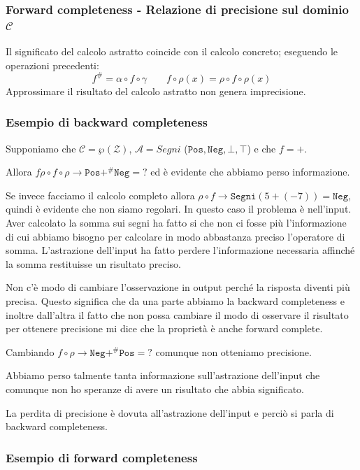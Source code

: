 \subsubsection{Forward completeness - Relazione di precisione sul dominio $\mathcal{C}$}
Il significato del calcolo astratto coincide con il calcolo concreto; eseguendo le operazioni 
precedenti:
\[
    f^\# = \alpha \circ f \circ \gamma \qquad f \circ \rho(x) = \rho \circ f \circ \rho(x)
\]
Approssimare il risultato del calcolo astratto non genera imprecisione.
\subsubsection{Esempio di backward completeness}
Supponiamo che $\mathcal{C} = \wp(\mathcal{Z})$, $\mathcal{A} = Segni$ ($\texttt{Pos}, \texttt{Neg},
\bot, \top$) e che $f=+$.

Allora $f \rho \circ f \circ \rho \to \texttt{Pos} +^\# \texttt{Neg} = ?$ ed è evidente che abbiamo perso informazione.

Se invece facciamo il calcolo completo allora $\rho \circ f \to \texttt{Segni}(5 + (-7)) = \texttt{Neg}$, quindi 
è evidente che non siamo regolari. In questo caso il problema è nell'input. Aver calcolato la somma 
sui segni ha fatto si che non ci fosse più l'informazione di cui abbiamo bisogno per calcolare
in modo abbastanza preciso l'operatore di somma. L'astrazione dell'input ha fatto perdere 
l'informazione necessaria affinché la somma restituisse un risultato preciso.

Non c'è modo di cambiare l'osservazione in output perché la risposta diventi più precisa. 
Questo significa che da una parte abbiamo la backward completeness e inoltre dall'altra il 
fatto che non possa cambiare il modo di osservare il risultato per ottenere precisione mi dice che la 
proprietà è anche forward complete.

Cambiando $f \circ \rho \to \texttt{Neg} +^\# \texttt{Pos} = ?$ comunque non otteniamo
precisione.

Abbiamo perso talmente tanta informazione sull'astrazione dell'input che comunque non 
ho speranze di avere un risultato che abbia significato. 

\begin{tcolorbox}
    La perdita di precisione è dovuta all'astrazione dell'input e perciò si parla di
    backward completeness.
\end{tcolorbox}
\subsubsection{Esempio di forward completeness}